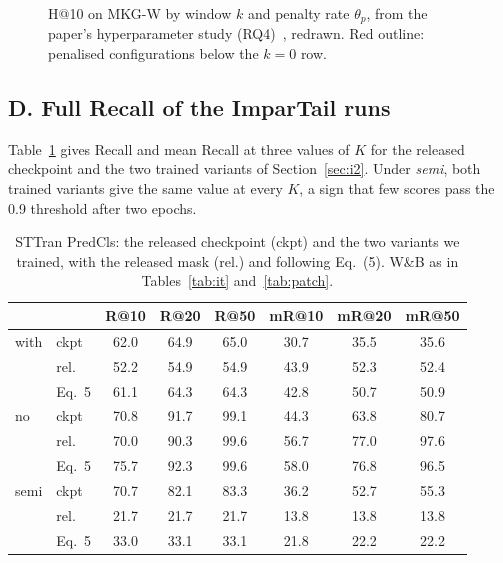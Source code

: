 \documentclass[conference,a4paper]{IEEEtran}
\begin{document}
\begin{figure}[!h]
\centering

\caption{H@10 on MKG-W by window $k$ and penalty rate $\theta_p$, from the paper's hyperparameter study (RQ4)~\cite{apkgc}, redrawn. Red outline: penalised configurations below the $k=0$ row.}
\label{fig:heatmkgw}
\end{figure}

\subsection*{D. Full Recall of the ImparTail runs}
Table~\ref{tab:itall} gives Recall and mean Recall at three values of $K$ for the released
checkpoint and the two trained variants of Section~\ref{sec:i2}. Under \emph{semi}, both trained
variants give the same value at every $K$, a sign that few scores pass the 0.9 threshold
after two epochs.

\begin{table}[!h]
\centering
\caption{STTran PredCls: the released checkpoint (ckpt) and the two variants we trained, with the released mask (rel.) and following Eq.~(5). W\&B as in Tables~\ref{tab:it} and~\ref{tab:patch}.}
\label{tab:itall}
\scriptsize
\setlength{\tabcolsep}{2.4pt}
\begin{tabular}{llcccccc}
\toprule
 & & R@10 & R@20 & R@50 & mR@10 & mR@20 & mR@50\\
\midrule
with & ckpt & 62.0 & 64.9 & 65.0 & 30.7 & 35.5 & 35.6\\
 & rel. & 52.2 & 54.9 & 54.9 & 43.9 & 52.3 & 52.4\\
 & Eq.~5 & 61.1 & 64.3 & 64.3 & 42.8 & 50.7 & 50.9\\
\midrule
no & ckpt & 70.8 & 91.7 & 99.1 & 44.3 & 63.8 & 80.7\\
 & rel. & 70.0 & 90.3 & 99.6 & 56.7 & 77.0 & 97.6\\
 & Eq.~5 & 75.7 & 92.3 & 99.6 & 58.0 & 76.8 & 96.5\\
\midrule
semi & ckpt & 70.7 & 82.1 & 83.3 & 36.2 & 52.7 & 55.3\\
 & rel. & 21.7 & 21.7 & 21.7 & 13.8 & 13.8 & 13.8\\
 & Eq.~5 & 33.0 & 33.1 & 33.1 & 21.8 & 22.2 & 22.2\\
\bottomrule
\end{tabular}
\end{table}
\end{document}
